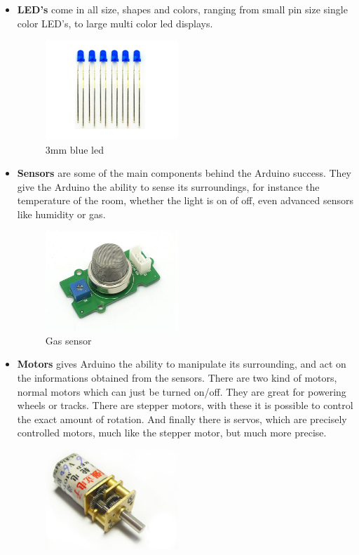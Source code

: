\begin{itemize}
\item[] \textbf{LED's} come in all size, shapes and colors, ranging from small pin size single color LED's, to large multi color led displays.
\begin{figure}[H]
\centering
\includegraphics[width=5cm]{billeder/led.jpg}
\caption{3mm blue led}
\end{figure}
\item[] \textbf{Sensors} are some of the main components behind the Arduino success. They give the Arduino the ability to sense its surroundings, for instance the temperature of the room, whether the light is on of off, even advanced sensors like humidity or gas.
\begin{figure}[H]
\centering
\includegraphics[width=5cm]{billeder/Sensor.jpg}
\caption{Gas sensor}
\end{figure}
\item[] \textbf{Motors} gives Arduino the ability to manipulate its surrounding, and act on the informations obtained from the sensors. There are two kind of motors, normal motors which can just be turned on/off. They are great for powering wheels or tracks. There are stepper motors, with these it is possible to control the exact amount of rotation. And finally there is servos, which are precisely controlled motors, much like the stepper motor, but much more precise.
\begin{figure}[H]
\centering
\includegraphics[width=5cm]{billeder/Motor.jpg}

\end{figure}
\end{itemize}
